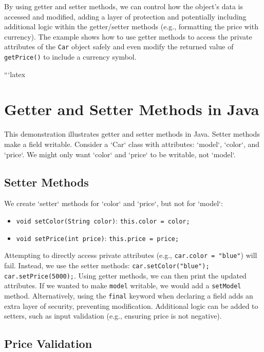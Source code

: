 \documentclass{article}
\begin{document}
By using getter and setter methods, we can control how the object's data is accessed and modified, adding a layer of protection and potentially including additional logic within the getter/setter methods (e.g., formatting the price with currency).  The example shows how to use getter methods to access the private attributes of the \texttt{Car} object safely and even modify the returned value of \texttt{getPrice()} to include a currency symbol.


```latex
\section{Getter and Setter Methods in Java}

This demonstration illustrates getter and setter methods in Java.  Setter methods make a field writable.  Consider a `Car` class with attributes: `model`, `color`, and `price`.  We might only want `color` and `price` to be writable, not `model`.

\subsection{Setter Methods}

We create `setter` methods for `color` and `price`, but not for `model`:

\begin{itemize}
    \item \texttt{void setColor(String color)}: \texttt{this.color = color;}
    \item \texttt{void setPrice(int price)}: \texttt{this.price = price;}
\end{itemize}

Attempting to directly access private attributes (e.g., \texttt{car.color = "blue"}) will fail. Instead, we use the setter methods: \texttt{car.setColor("blue"); car.setPrice(5000);}.  Using getter methods, we can then print the updated attributes.  If we wanted to make \texttt{model} writable, we would add a \texttt{setModel} method.  Alternatively, using the \texttt{final} keyword when declaring a field adds an extra layer of security, preventing modification.  Additional logic can be added to setters, such as input validation (e.g., ensuring price is not negative).

\subsection{Price Validation}
\end{document}
